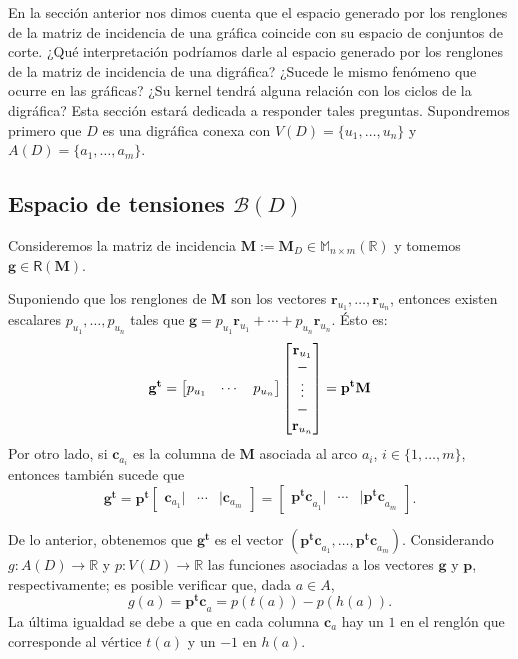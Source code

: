  En la sección anterior nos dimos cuenta que el espacio generado por los renglones de la matriz de incidencia de una gráfica coincide con su espacio de conjuntos de corte. ¿Qué interpretación podríamos darle al espacio generado por los renglones de la matriz de incidencia de una digráfica? ¿Sucede le mismo fenómeno que ocurre en las gráficas? ¿Su kernel tendrá alguna relación con los ciclos de la digráfica? Esta sección estará dedicada a responder tales preguntas. Supondremos primero que $D$ es una digráfica conexa con $V(D) = \{u_{1}, \ldots, u_{n}\}$ y $A(D)= \{ a_{1}, \ldots, a_{m}\}$.

\subsection{Espacio de tensiones $\mathcal{B}(D)$}

 Consideremos la matriz de incidencia $\mathbf{M}:=\mathbf{M}_{D} \in \mathbb{M}_{n \times m}(\mathbb{R})$ y tomemos $\mathbf{g}\in \mathsf{R}(\mathbf{M})$.

Suponiendo que los renglones de $\mathbf{M}$ son los vectores $\mathbf{r}_{u_1}, \ldots, \mathbf{r}_{u_n}$, entonces existen escalares $p_{u_{1}}, \ldots, p_{u_{n}}$ tales que $\mathbf{g} = p_{u_{1}}\mathbf{r}_{u_{1}} + \cdots + p_{u_{n}}\mathbf{r}_{u_{n}}$. Ésto es:
$$
\mathbf{g^{t}} = \begin{bmatrix}
p_{u_{1}} & \cdots & p_{u_{n}} 
\end{bmatrix}
\begin{bmatrix}
\mathbf{r}_{u_{1}}\\ 
\-- \\
\vdots\\
\--\\
\mathbf{r}_{u_{n}}
\end{bmatrix} = \mathbf{p^{t}M}
$$
Por otro lado, si $\mathbf{c}_{a_{i}}$ es la columna de $\mathbf{M}$ asociada al arco $a_{i}$, $i \in \{1, \ldots, m\}$, entonces también sucede que $$\mathbf{g^{t}}=\mathbf{p^{t}}\begin{bmatrix}
\mathbf{c}_{a_{1}} | & \cdots & |\mathbf{c}_{a_{m}} 
\end{bmatrix} = \begin{bmatrix}
\mathbf{p^{t}c}_{a_{1}} | & \cdots & |\mathbf{p^{t}c}_{a_{m}} 
\end{bmatrix}.
$$

De lo anterior, obtenemos que $\mathbf{g^{t}}$ es el vector $(\mathbf{p^{t}c}_{a_{1}},  \ldots, \mathbf{p^{t}c}_{a_{m}})$. Considerando $g\colon A(D) \rightarrow \mathbb{R}$ y $p \colon V(D) \rightarrow \mathbb{R}$ las funciones asociadas a los vectores $\mathbf{g}$ y $\mathbf{p}$, respectivamente; es posible verificar que, dada $a \in A$, 
\begin{equation} \label{eq:tensiones}
    g(a) = \mathbf{p^{t}c}_{a} = p(t(a)) - p(h(a)).
\end{equation}
La última igualdad se debe a que en cada columna $\mathbf{c}_{a}$ hay un $1$ en el renglón que corresponde al vértice $t(a)$ y un $-1$ en $h(a)$.

